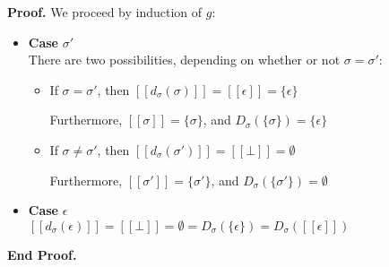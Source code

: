 \documentclass{article}
\newcommand{\interp}[1]{[\![{#1}]\!]}
\newcommand{\setof}[1]{\{{#1}\}}
\newcommand{\semderiv}[2]{D_{#1}({#2})}
\newcommand{\deriv}[2]{d_{#1}({#2})}
\newenvironment{proof}{\noindent\textbf{Proof.}}
{\noindent\textbf{End Proof.}}
\newenvironment{caseblock}{\begin{itemize}}{\end{itemize}}
\newenvironment{case}[1]{\item \textbf{Case} {#1}\\}{}
\begin{document}
\begin{proof}
  We proceed by induction of $g$: 

  \begin{caseblock}
    \begin{case}{$\sigma'$}
      There are two possibilities, depending on whether or not $\sigma = \sigma'$: 
      \begin{itemize}
        \item If $\sigma = \sigma'$, then $\interp{\deriv{\sigma}{\sigma}} = \interp{\epsilon} = \setof{\epsilon}$

          Furthermore, $\interp{\sigma} = \setof{\sigma}$, and $\semderiv{\sigma}{\setof{\sigma}} = \setof{\epsilon}$
        \item If $\sigma \not= \sigma'$, then $\interp{\deriv{\sigma}{\sigma'}} = \interp{\bot} = \emptyset$
          
          Furthermore, $\interp{\sigma'} = \setof{\sigma'}$, and $\semderiv{\sigma}{\setof{\sigma'}} = \emptyset$
      \end{itemize}
    \end{case}

    \begin{case}{$\epsilon$}
      $\interp{\deriv{\sigma}{\epsilon}} = \interp{\bot} = \emptyset = \semderiv{\sigma}{\setof{\epsilon}} = \semderiv{\sigma}{\interp{\epsilon}}$
    \end{case}


\end{caseblock}
\end{proof}
\end{document}
